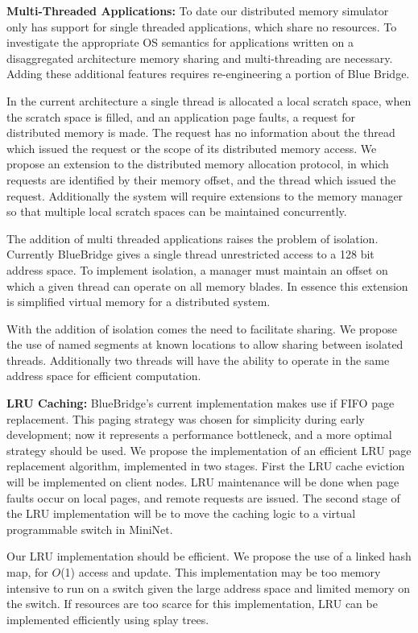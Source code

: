 \textbf{Multi-Threaded Applications:} To date our
distributed memory simulator only has support for single threaded
applications, which share no resources. To investigate the appropriate
OS semantics for applications written on a disaggregated architecture
memory sharing and multi-threading are necessary. Adding these
additional features requires re-engineering a portion of Blue Bridge.

In the current architecture a single thread is allocated a local
scratch space, when the scratch space is filled, and an application
page faults, a request for distributed memory is made. The request has
no information about the thread which issued the request or the scope
of its distributed memory access. We propose an extension to the
distributed memory allocation protocol, in which requests are
identified by their memory offset, and the thread which issued the
request. Additionally the system will require extensions to the memory
manager so that multiple local scratch spaces can be maintained
concurrently.

The addition of multi threaded applications raises the problem of
isolation. Currently BlueBridge gives a single thread unrestricted
access to a 128 bit address space. To implement isolation, a manager
must maintain an offset on which a given thread can operate on all
memory blades. In essence this extension is simplified virtual memory
for a distributed system.

With the addition of isolation comes the need to facilitate sharing.
We propose the use of named segments at known locations to allow
sharing between isolated threads. Additionally two threads will have
the ability to operate in the same address space for efficient
computation.

\textbf{LRU Caching:} BlueBridge's current implementation
makes use if FIFO page replacement. This paging strategy was chosen
for simplicity during early development; now it represents a
performance bottleneck, and a more optimal strategy should be used. We
propose the implementation of an efficient LRU page replacement
algorithm, implemented in two stages. First the LRU cache eviction
will be implemented on client nodes. LRU maintenance will be done when
page faults occur on local pages, and remote requests are issued. The
second stage of the LRU implementation will be to move the caching
logic to a virtual programmable switch in MiniNet.

Our LRU implementation should be efficient. We propose the use of a
linked hash map, for $O$(1) access and update. This implementation may
be too memory intensive to run on a switch given the large address
space and limited memory on the switch. If resources are too scarce
for this implementation, LRU can be implemented efficiently using
splay trees.

